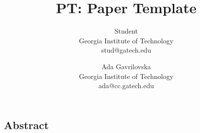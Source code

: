 \documentclass[letterpaper,twocolumn,10pt]{article}
\begin{document}
\date{}

\title{\Large \bf PT: Paper Template}

\author{
  {\rm Student}\\
  Georgia Institute of Technology\\
  stud@gatech.edu
  \and
  {\rm Ada Gavrilovska}\\
  Georgia Institute of Technology\\
  ada@cc.gatech.edu
}

\maketitle


\subsection*{Abstract}











%



\end{document}

